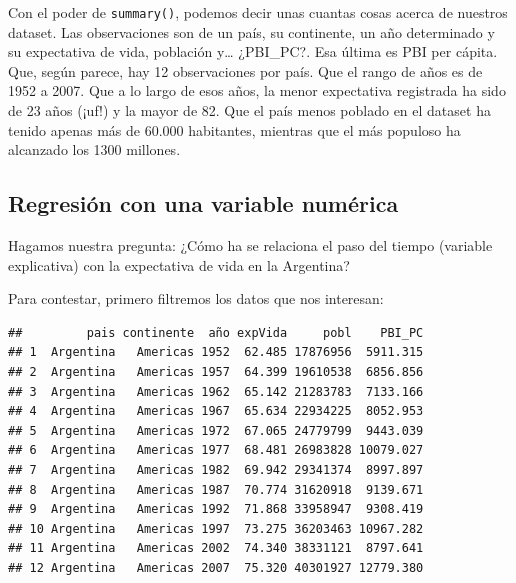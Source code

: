 \documentclass[]{book}
\newenvironment{Shaded}{\begin{snugshade}}{\end{snugshade}}
\newcommand{\KeywordTok}[1]{\textcolor[rgb]{0.13,0.29,0.53}{\textbf{#1}}}
\newcommand{\StringTok}[1]{\textcolor[rgb]{0.31,0.60,0.02}{#1}}
\newcommand{\OperatorTok}[1]{\textcolor[rgb]{0.81,0.36,0.00}{\textbf{#1}}}
\newcommand{\NormalTok}[1]{#1}
\begin{document}
Con el poder de \texttt{summary()}, podemos decir unas cuantas cosas
acerca de nuestros dataset. Las observaciones son de un país, su
continente, un año determinado y su expectativa de vida, población
y\ldots{} ¿PBI\_PC?. Esa última es PBI per cápita. Que, según parece,
hay 12 observaciones por país. Que el rango de años es de 1952 a 2007.
Que a lo largo de esos años, la menor expectativa registrada ha sido de
23 años (¡uf!) y la mayor de 82. Que el país menos poblado en el dataset
ha tenido apenas más de 60.000 habitantes, mientras que el más populoso
ha alcanzado los 1300 millones.

\subsection{Regresión con una variable
numérica}\label{regresion-con-una-variable-numerica}

Hagamos nuestra pregunta: ¿Cómo ha se relaciona el paso del tiempo
(variable explicativa) con la expectativa de vida en la Argentina?

Para contestar, primero filtremos los datos que nos interesan:

\begin{Shaded}
\end{Shaded}

\begin{verbatim}
##         pais continente  año expVida     pobl    PBI_PC
## 1  Argentina   Americas 1952  62.485 17876956  5911.315
## 2  Argentina   Americas 1957  64.399 19610538  6856.856
## 3  Argentina   Americas 1962  65.142 21283783  7133.166
## 4  Argentina   Americas 1967  65.634 22934225  8052.953
## 5  Argentina   Americas 1972  67.065 24779799  9443.039
## 6  Argentina   Americas 1977  68.481 26983828 10079.027
## 7  Argentina   Americas 1982  69.942 29341374  8997.897
## 8  Argentina   Americas 1987  70.774 31620918  9139.671
## 9  Argentina   Americas 1992  71.868 33958947  9308.419
## 10 Argentina   Americas 1997  73.275 36203463 10967.282
## 11 Argentina   Americas 2002  74.340 38331121  8797.641
## 12 Argentina   Americas 2007  75.320 40301927 12779.380
\end{verbatim}
\end{document}
